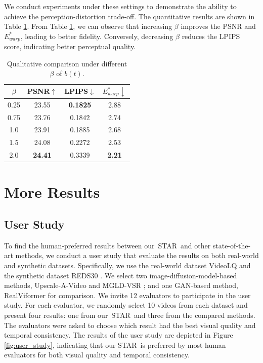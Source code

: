\documentclass[10pt,twocolumn,letterpaper,table]{article}
\newcommand{\name}{STAR}
\begin{document}
We conduct experiments under these settings to demonstrate the ability to achieve the perception-distortion trade-off. The quantitative results are shown in Table \ref{tab:beta_ablation}. From Table \ref{tab:beta_ablation}, we can observe that increasing $\beta$ improves the PSNR and $E_{warp}^*$, leading to better fidelity. Conversely, decreasing $\beta$ reduces the LPIPS score, indicating better perceptual quality.


\begin{table}[]
    \centering
    \caption{Qualitative comparison under different $\beta$ of $b(t)$.}
    \begin{tabular}{c|ccc}
    \hline
    $\beta$ & PSNR$\uparrow$ & LPIPS$\downarrow$ & $E_{warp}^*\downarrow$ \\ \hline
       0.25 & 23.55 & \textbf{0.1825} & 2.88  \\
       0.75 & 23.76 & 0.1842 & 2.74  \\
       1.0 & 23.91 & 0.1885 & 2.68  \\
       1.5 & 24.08 & 0.2272 & 2.53  \\
       2.0 & \textbf{24.41} & 0.3339 & \textbf{2.21} \\ \hline
    \end{tabular}
    \label{tab:beta_ablation}
\end{table}


\section{More Results}
\subsection{User Study}
To find the human-preferred results between our~\name~and other state-of-the-art methods, we conduct a user study that evaluate the results on both real-world and synthetic datasets. Specifically, we use the real-world dataset VideoLQ \cite{chan2022investigating} and the synthetic dataset REDS30 \cite{nah2019ntire}. We select two image-diffusion-model-based methods, Upscale-A-Video \cite{zhou2024upscale} and MGLD-VSR \cite{yang2023mgldvsr}; and one GAN-based method, RealViformer \cite{zhang2024realviformer} for comparison. 
We invite 12 evaluators to participate in the user study. For each evaluator, we randomly select 10 videos from each dataset and present four results: one from our~\name~and three from the compared methods. The evaluators were asked to choose which result had the best visual quality and temporal consistency.
The results of the user study are depicted in Figure \ref{fig:user_study}, indicating that our \name\ is preferred by most human evaluators for both visual quality and temporal consistency.
\end{document}
